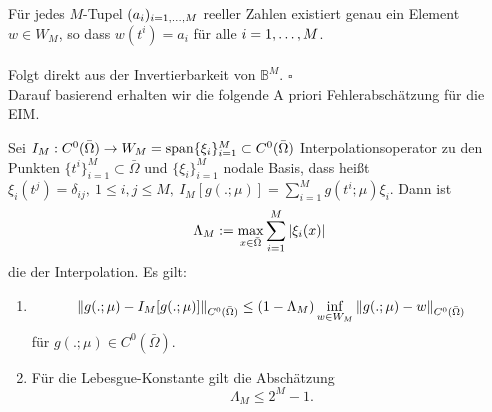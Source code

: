 Für jedes $M$-Tupel $(a_i)_{i=1, \dots ,M}$ reeller Zahlen existiert genau ein Element $w\in W_M$, so dass $w(t^i)=a_i$ für alle $i=1, \dots ,M$.\\

\\
Folgt direkt aus der Invertierbarkeit von $\mathbb{B}^M$.
\hfill $\square$\\

Darauf basierend erhalten wir die folgende A priori Fehlerabschätzung für die EIM.

Sei $I_M:C^0(\bar{\Omega}) \to W_M = \operatorname{span}\{\xi_i\}_{i=1}^M \subset C^0(\bar{\Omega})$ Interpolationsoperator zu den Punkten $\{t^i\}_{i=1}^M\subset \bar{\Omega}$ und $\{\xi_i\}_{i=1}^M$ nodale Basis, dass heißt $\xi_i(t^j)=\delta_{ij}, ~1\le i,j\le M,~I_M[g(.;\mu)] = \sum_{i=1}^{M} g(t^i;\mu)\xi_i$.
Dann ist 
\[
\Lambda_M := \max\limits_{x\in\bar{\Omega}} \sum_{i=1}^M \left\vert\xi_i(x)\right\vert
\]
die  der Interpolation.
Es gilt:
\begin{enumerate}[(1)]
	\item 
	\[
	\left\Vert g(.;\mu) - I_M[g(.;\mu)]\right\Vert_{C^0(\bar{\Omega})} \le (1-\Lambda_M) \inf\limits_{w\in W_M} \left\Vert g(.;\mu) - w\right\Vert_{C^0(\bar{\Omega})}
	\]
	für $g(.;\mu)\in C^0(\bar{\Omega})$.
	\item Für die Lebesgue-Konstante gilt die Abschätzung
	\[
	\Lambda_M \le 2^M -1.
	\]
\end{enumerate}

